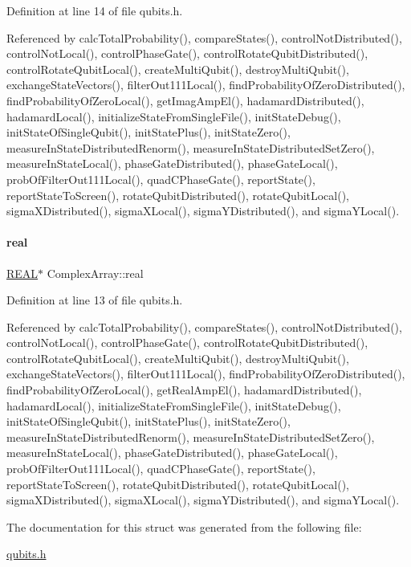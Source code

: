Definition at line 14 of file qubits.\+h.



Referenced by calc\+Total\+Probability(), compare\+States(), control\+Not\+Distributed(), control\+Not\+Local(), control\+Phase\+Gate(), control\+Rotate\+Qubit\+Distributed(), control\+Rotate\+Qubit\+Local(), create\+Multi\+Qubit(), destroy\+Multi\+Qubit(), exchange\+State\+Vectors(), filter\+Out111\+Local(), find\+Probability\+Of\+Zero\+Distributed(), find\+Probability\+Of\+Zero\+Local(), get\+Imag\+Amp\+El(), hadamard\+Distributed(), hadamard\+Local(), initialize\+State\+From\+Single\+File(), init\+State\+Debug(), init\+State\+Of\+Single\+Qubit(), init\+State\+Plus(), init\+State\+Zero(), measure\+In\+State\+Distributed\+Renorm(), measure\+In\+State\+Distributed\+Set\+Zero(), measure\+In\+State\+Local(), phase\+Gate\+Distributed(), phase\+Gate\+Local(), prob\+Of\+Filter\+Out111\+Local(), quad\+C\+Phase\+Gate(), report\+State(), report\+State\+To\+Screen(), rotate\+Qubit\+Distributed(), rotate\+Qubit\+Local(), sigma\+X\+Distributed(), sigma\+X\+Local(), sigma\+Y\+Distributed(), and sigma\+Y\+Local().

\mbox{\label{structComplexArray_a4195cac6c784ea1b6271f1c7dba1548a}} 
\paragraph{\texorpdfstring{real}{real}}
{\footnotesize\ttfamily \hyperlink{precision_8h_a4b654506f18b8bfd61ad2a29a7e38c25}{R\+E\+AL}$\ast$ Complex\+Array\+::real}



Definition at line 13 of file qubits.\+h.



Referenced by calc\+Total\+Probability(), compare\+States(), control\+Not\+Distributed(), control\+Not\+Local(), control\+Phase\+Gate(), control\+Rotate\+Qubit\+Distributed(), control\+Rotate\+Qubit\+Local(), create\+Multi\+Qubit(), destroy\+Multi\+Qubit(), exchange\+State\+Vectors(), filter\+Out111\+Local(), find\+Probability\+Of\+Zero\+Distributed(), find\+Probability\+Of\+Zero\+Local(), get\+Real\+Amp\+El(), hadamard\+Distributed(), hadamard\+Local(), initialize\+State\+From\+Single\+File(), init\+State\+Debug(), init\+State\+Of\+Single\+Qubit(), init\+State\+Plus(), init\+State\+Zero(), measure\+In\+State\+Distributed\+Renorm(), measure\+In\+State\+Distributed\+Set\+Zero(), measure\+In\+State\+Local(), phase\+Gate\+Distributed(), phase\+Gate\+Local(), prob\+Of\+Filter\+Out111\+Local(), quad\+C\+Phase\+Gate(), report\+State(), report\+State\+To\+Screen(), rotate\+Qubit\+Distributed(), rotate\+Qubit\+Local(), sigma\+X\+Distributed(), sigma\+X\+Local(), sigma\+Y\+Distributed(), and sigma\+Y\+Local().



The documentation for this struct was generated from the following file\+:\begin{DoxyCompactItemize}
\item 
\hyperlink{qubits_8h}{qubits.\+h}\end{DoxyCompactItemize}

